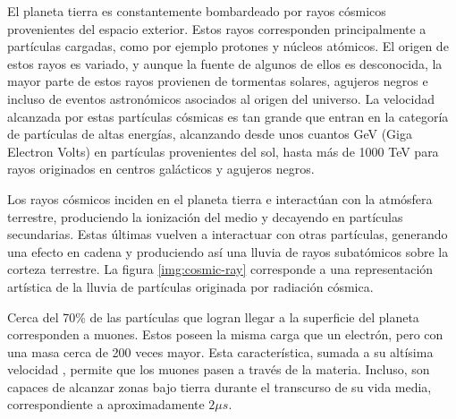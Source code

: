 	El planeta tierra es constantemente bombardeado por rayos cósmicos provenientes del espacio exterior. Estos rayos corresponden principalmente a partículas cargadas, como por ejemplo protones y núcleos atómicos.  El origen de estos rayos es variado, y aunque la fuente de algunos de ellos es desconocida, la mayor parte de estos rayos provienen de tormentas solares, agujeros negros e incluso de eventos astronómicos asociados al origen del universo. La velocidad alcanzada por estas partículas cósmicas es tan grande que entran en la categoría de partículas de altas energías, alcanzando desde unos cuantos GeV (Giga Electron Volts) en partículas provenientes del sol, hasta más de 1000 TeV para rayos originados en centros galácticos y agujeros negros. 
	
	
	Los rayos cósmicos inciden en el planeta tierra e interactúan con la atmósfera terrestre, produciendo la ionización del medio y decayendo en partículas secundarias. Estas últimas vuelven a interactuar con otras partículas, generando una efecto en cadena y produciendo así una lluvia de rayos subatómicos sobre la corteza terrestre. La figura \ref{img:cosmic-ray} corresponde a una representación artística de la lluvia de partículas originada por radiación cósmica.
	
	Cerca del 70\% de las partículas que logran llegar a la superficie del planeta corresponden a muones. Estos poseen la misma carga que un electrón, pero con una masa cerca de 200 veces mayor. Esta característica, sumada a su altísima velocidad , permite que los muones pasen a través de la materia. Incluso, son capaces de alcanzar zonas bajo tierra durante el transcurso de su vida media, correspondiente a aproximadamente $2\mu s$.
	
